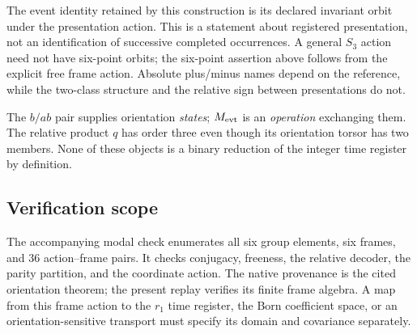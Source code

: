 The event identity retained by this construction is its declared invariant orbit under the presentation action. This is a statement about registered presentation, not an identification of successive completed occurrences. A general $S_3$ action need not have six-point orbits; the six-point assertion above follows from the explicit free frame action. Absolute plus/minus names depend on the reference, while the two-class structure and the relative sign between presentations do not.

The $b/ab$ pair supplies orientation \emph{states}; $M_{\mathrm{evt}}$ is an \emph{operation} exchanging them. The relative product $q$ has order three even though its orientation torsor has two members. None of these objects is a binary reduction of the integer time register by definition.

\subsection*{Verification scope}
The accompanying modal check enumerates all six group elements, six frames, and 36 action--frame pairs. It checks conjugacy, freeness, the relative decoder, the parity partition, and the coordinate action. The native provenance is the cited orientation theorem; the present replay verifies its finite frame algebra. A map from this frame action to the $r_1$ time register, the Born coefficient space, or an orientation-sensitive transport must specify its domain and covariance separately.
\endgroup
\setcounter{section}{13}

